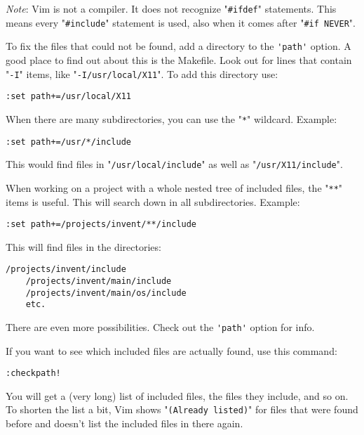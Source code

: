 \emph{Note}:
Vim is not a compiler.
It does not recognize "\verb!#ifdef!" statements.
This means every "\verb!#include!" statement is used, also when it comes after "\verb!#if NEVER!".

To fix the files that could not be found, add a directory to the \verb!'path'! option.
A good place to find out about this is the Makefile.
Look out for lines that contain "\verb!-I!" items, like "\verb!-I/usr/local/X11!".
To add this directory use:

\begin{Verbatim}[samepage=true]
 :set path+=/usr/local/X11
\end{Verbatim}

When there are many subdirectories, you can use the "\verb!*!" wildcard.
Example:

\begin{Verbatim}[samepage=true]
 :set path+=/usr/*/include
\end{Verbatim}

This would find files in "\verb!/usr/local/include!" as well as "\verb!/usr/X11/include!".

When working on a project with a whole nested tree of included files, the "\verb!**!" items is useful.
This will search down in all subdirectories.
Example:

\begin{Verbatim}[samepage=true]
 :set path+=/projects/invent/**/include
\end{Verbatim}

This will find files in the directories:

\begin{Verbatim}[samepage=true]
    /projects/invent/include 
    /projects/invent/main/include 
    /projects/invent/main/os/include 
    etc.
\end{Verbatim}

There are even more possibilities.
Check out the \verb!'path'! option for info.

If you want to see which included files are actually found, use this command:

\begin{Verbatim}[samepage=true]
 :checkpath!
\end{Verbatim}

You will get a (very long) list of included files, the files they include, and so on.
To shorten the list a bit, Vim shows "\verb!(Already listed)!" for files that were found before and doesn't list the included files in there again.

